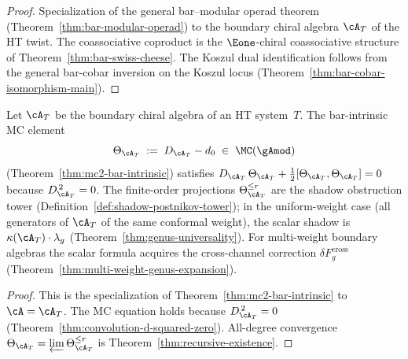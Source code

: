 \begin{proof}
Specialization of the general bar--modular operad theorem
(Theorem~\ref{thm:bar-modular-operad}) to the boundary chiral
algebra $\cA_T$ of the HT twist. The coassociative coproduct is
the $\Eone$-chiral coassociative structure of
Theorem~\ref{thm:bar-swiss-cheese}. The Koszul dual identification
follows from the general bar-cobar inversion on the Koszul locus
(Theorem~\ref{thm:bar-cobar-isomorphism-main}).
\end{proof}

\begin{theorem}
\label{thm:ht-mc-all-genera}
Let $\cA_T$ be the boundary chiral algebra of an HT system~$T$.
The bar-intrinsic MC element
\begin{equation}\label{eq:ht-theta}
\Theta_{\cA_T}
\;:=\; D_{\cA_T} - d_0
\;\in\; \MC(\gAmod)
\end{equation}
\textup{(}Theorem~\textup{\ref{thm:mc2-bar-intrinsic}}\textup{)}
satisfies
$D_{\cA_T}\,\Theta_{\cA_T}
+ \tfrac{1}{2}[\Theta_{\cA_T},\Theta_{\cA_T}] = 0$
because $D_{\cA_T}^{\,2} = 0$. The finite-order projections
$\Theta_{\cA_T}^{\leq r}$ are the shadow obstruction tower
\textup{(}Definition~\textup{\ref{def:shadow-postnikov-tower}}\textup{)};
in the uniform-weight case
\textup{(}all generators of $\cA_T$ of the same conformal
weight\textup{)}, the scalar shadow is
$\kappa(\cA_T) \cdot \lambda_g$
\textup{(}Theorem~\textup{\ref{thm:genus-universality}}\textup{)}.
For multi-weight boundary algebras the scalar formula
acquires the cross-channel correction
$\delta F_g^{\mathrm{cross}}$
\textup{(}Theorem~\textup{\ref{thm:multi-weight-genus-expansion}}\textup{)}.
\end{theorem}

\begin{proof}
This is the specialization of
Theorem~\ref{thm:mc2-bar-intrinsic} to $\cA = \cA_T$. The MC
equation holds because $D_{\cA_T}^{\,2} = 0$
(Theorem~\ref{thm:convolution-d-squared-zero}). All-degree
convergence $\Theta_{\cA_T} = \varprojlim \Theta_{\cA_T}^{\leq r}$
is Theorem~\ref{thm:recursive-existence}.
\end{proof}

